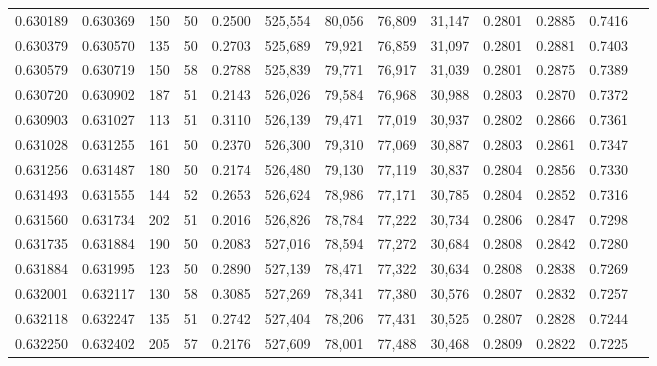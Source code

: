 \begin{tabular}{rrrrrrrrrrrrr}
0.630189 & 0.630369 &   150 &  50 &                                     0.2500 & 525,554 &  80,056 &  76,809 &  31,147 & 0.2801 & 0.2885 & 0.7416 \\
0.630379 & 0.630570 &   135 &  50 &                                     0.2703 & 525,689 &  79,921 &  76,859 &  31,097 & 0.2801 & 0.2881 & 0.7403 \\
0.630579 & 0.630719 &   150 &  58 &                                     0.2788 & 525,839 &  79,771 &  76,917 &  31,039 & 0.2801 & 0.2875 & 0.7389 \\
0.630720 & 0.630902 &   187 &  51 &                                     0.2143 & 526,026 &  79,584 &  76,968 &  30,988 & 0.2803 & 0.2870 & 0.7372 \\
0.630903 & 0.631027 &   113 &  51 &                                     0.3110 & 526,139 &  79,471 &  77,019 &  30,937 & 0.2802 & 0.2866 & 0.7361 \\
0.631028 & 0.631255 &   161 &  50 &                                     0.2370 & 526,300 &  79,310 &  77,069 &  30,887 & 0.2803 & 0.2861 & 0.7347 \\
0.631256 & 0.631487 &   180 &  50 &                                     0.2174 & 526,480 &  79,130 &  77,119 &  30,837 & 0.2804 & 0.2856 & 0.7330 \\
0.631493 & 0.631555 &   144 &  52 &                                     0.2653 & 526,624 &  78,986 &  77,171 &  30,785 & 0.2804 & 0.2852 & 0.7316 \\
0.631560 & 0.631734 &   202 &  51 &                                     0.2016 & 526,826 &  78,784 &  77,222 &  30,734 & 0.2806 & 0.2847 & 0.7298 \\
0.631735 & 0.631884 &   190 &  50 &                                     0.2083 & 527,016 &  78,594 &  77,272 &  30,684 & 0.2808 & 0.2842 & 0.7280 \\
0.631884 & 0.631995 &   123 &  50 &                                     0.2890 & 527,139 &  78,471 &  77,322 &  30,634 & 0.2808 & 0.2838 & 0.7269 \\
0.632001 & 0.632117 &   130 &  58 &                                     0.3085 & 527,269 &  78,341 &  77,380 &  30,576 & 0.2807 & 0.2832 & 0.7257 \\
0.632118 & 0.632247 &   135 &  51 &                                     0.2742 & 527,404 &  78,206 &  77,431 &  30,525 & 0.2807 & 0.2828 & 0.7244 \\
0.632250 & 0.632402 &   205 &  57 &                                     0.2176 & 527,609 &  78,001 &  77,488 &  30,468 & 0.2809 & 0.2822 & 0.7225 \\

\end{tabular}
